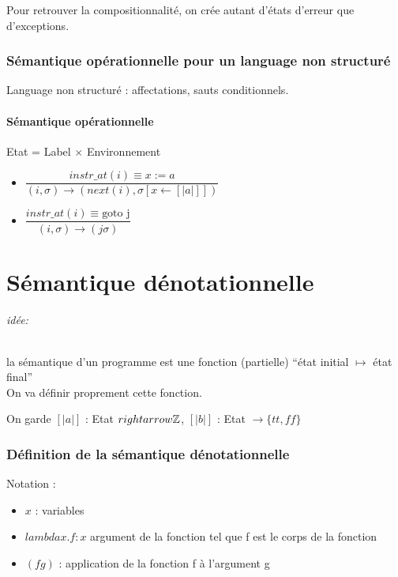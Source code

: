 \documentclass[10pt,a4paper]{article}
\newcommand{\sem}[1]{$\left[| #1 | \right]$}
\newcommand{\semm}[1]{\left[| #1 | \right]}
\begin{document}
Pour retrouver la compositionnalité, on crée autant d'états d'erreur que d'exceptions.

\section{Sémantique opérationnelle pour un language non structuré}
Language non structuré : affectations, sauts conditionnels.

\subsection{Sémantique opérationnelle}
Etat = Label $\times$ Environnement\\

\begin{itemize}
\item $\dfrac{instr\_at(i) \equiv x:=a }{(i, \sigma) \rightarrow (next(i), \sigma[x \leftarrow \semm{a}])}$\\
\item $\dfrac{instr\_at(i) \equiv \text{goto j} }{(i, \sigma) \rightarrow (j \sigma)}$
\end{itemize}

\part{Sémantique dénotationnelle}
\paragraph{idée:} la sémantique d'un programme est une fonction (partielle) ``état initial $\mapsto$ état final''\\
On va définir proprement cette fonction.

On garde \sem{a} : Etat $rightarrow \mathbb{Z}$, \sem{b} : Etat $\rightarrow \{tt, ff \}$

\section{Définition de la sémantique dénotationnelle}
Notation :\begin{itemize}
           \item $x$ : variables
           \item $lambda x . f : x$  argument de la fonction tel que f est le corps de la fonction
           \item $(f g)$ : application de la fonction f à l'argument g
          \end{itemize}
\end{document}
